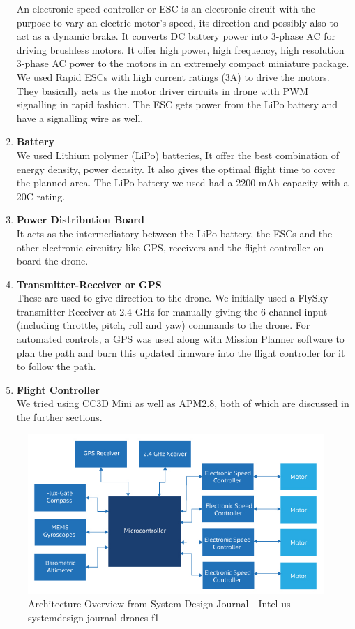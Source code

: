 \begin{enumerate}
    An electronic speed controller or ESC is an electronic circuit with the purpose to vary an electric motor's speed, its direction and possibly also to act as a dynamic brake. It converts DC battery power into 3-phase AC for driving brushless motors. It offer high power, high frequency, high resolution 3-phase AC power to the motors in an extremely compact miniature package. We used Rapid ESCs with high current ratings (3A) to drive the motors. They basically acts as the motor driver circuits in drone with PWM signalling in rapid fashion. The ESC gets power from the LiPo battery and have a signalling wire as well.
    \item \textbf{Battery}\\ 
    We used Lithium polymer (LiPo) batteries, It offer the best combination of energy density, power density. It also gives the optimal flight time to cover the planned area. The LiPo battery we used had a 2200 mAh capacity with a 20C rating.
    \item \textbf{Power Distribution Board}\\
    It acts as the intermediatory between the LiPo battery, the ESCs and the other electronic circuitry like GPS, receivers and the flight controller on board the drone.
    \item \textbf{Transmitter-Receiver or GPS}\\
    These are used to give direction to the drone. We initially used a FlySky transmitter-Receiver at 2.4 GHz for manually giving the 6 channel input (including throttle, pitch, roll and yaw) commands to the drone. For automated controls, a GPS was used along with Mission Planner software to plan the path and burn this updated firmware into the flight controller for it to follow the path. 
    \item \textbf{Flight Controller} \\
    We tried using CC3D Mini as well as APM2.8, both of which are discussed in the further sections.
\end{enumerate}

\begin{figure}[H]
    \centering
    \includegraphics[]{SummerInterReport/project/Images-Major/block.png}
    \caption{Architecture Overview from System Design Journal - Intel
us-systemdesign-journal-drones-f1}
    \label{fig:compEy}
\end{figure}


